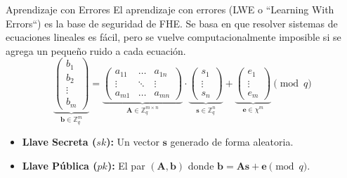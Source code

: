 \begin{frame}{Aprendizaje con Errores}
    El aprendizaje con errores (LWE o ``Learning With Errors``) es la base de seguridad de FHE. Se basa en que resolver sistemas de ecuaciones lineales es fácil, pero se vuelve computacionalmente imposible si se agrega un pequeño ruido a cada ecuación.
    \vspace{0.3cm}
    \[
        \underbrace{
        \begin{pmatrix} b_1 \\ b_2 \\ \vdots \\ b_m \end{pmatrix}
        }_{\mathbf{b} \in \mathbb{Z}_q^m}
        =
        \underbrace{
        \begin{pmatrix} 
        a_{11} & \dots & a_{1n} \\
        \vdots & \ddots & \vdots \\
        a_{m1} & \dots & a_{mn} 
        \end{pmatrix}
        }_{\mathbf{A} \in \mathbb{Z}_q^{m \times n}}
        \cdot
        \underbrace{
        \begin{pmatrix} s_1 \\ \vdots \\ s_n \end{pmatrix}
        }_{\mathbf{s} \in \mathbb{Z}_q^n}
        +
        \underbrace{
        \begin{pmatrix} e_1 \\ \vdots \\ e_m \end{pmatrix}
        }_{\mathbf{e} \in \chi^m} \pmod q
    \]
    \begin{itemize}
        \item \textbf{Llave Secreta ($sk$):} Un vector $\mathbf{s}$ generado de forma aleatoria.
        \item \textbf{Llave Pública ($pk$):} El par $(\mathbf{A}, \mathbf{b})$ donde $\mathbf{b} = \mathbf{As} + \mathbf{e} \pmod q$.
    \end{itemize}
\end{frame}

